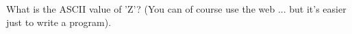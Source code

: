 What is the ASCII value of 'Z'? (You can of course use the web ... but it's easier just to write a program).

